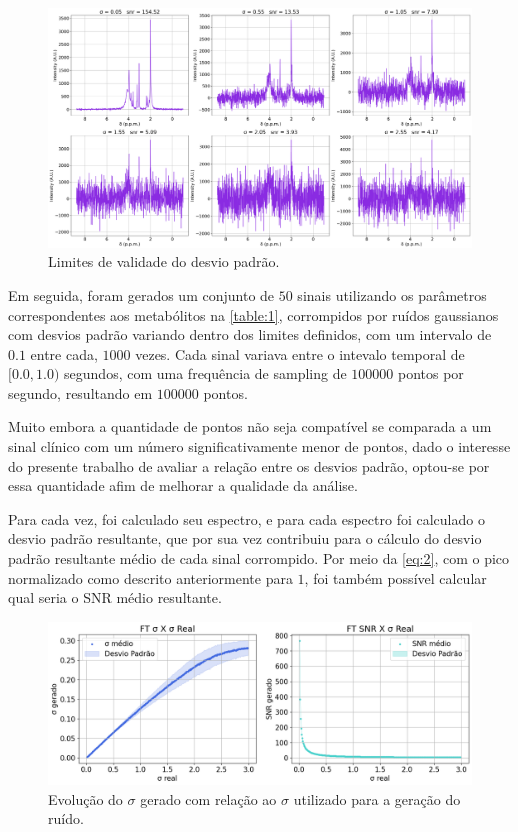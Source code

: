\documentclass[12pt]{article}
\begin{document}
\begin{figure}[H]
    \includegraphics[scale=0.22]{snr_limits.png}
    \centering
    \caption{Limites de validade do desvio padrão.}
    \label{fig:9}
\end{figure}

Em seguida, foram gerados um conjunto de $50$ sinais utilizando os parâmetros correspondentes aos metabólitos na \autoref{table:1}, corrompidos por ruídos gaussianos com desvios padrão variando dentro dos limites definidos, com um intervalo de $0.1$ entre cada, $1000$ vezes. Cada sinal variava 
entre o intevalo temporal de $[0.0, 1.0)$ segundos, com uma frequência de sampling de $100000$ pontos por segundo, resultando em $100000$ pontos. 

Muito embora a quantidade de pontos não seja compatível se comparada a um sinal clínico com um número significativamente menor de pontos, dado o interesse do presente trabalho de avaliar a relação entre os desvios padrão, optou-se por essa quantidade afim de melhorar a qualidade da análise.

Para cada vez, foi calculado seu espectro, e para cada espectro foi calculado o desvio padrão resultante, que por sua vez contribuiu para o cálculo do desvio padrão 
resultante médio de cada sinal corrompido. Por meio da \autoref{eq:2}, com o pico normalizado como descrito anteriormente para $1$, foi também possível calcular qual seria o SNR médio resultante.

\begin{figure} [H]
    \includegraphics[scale=0.37]{evolucao-sigmas.png}
    \centering
    \caption{Evolução do $\sigma$ gerado com relação ao $\sigma$ utilizado para a geração do ruído.}
    \label{fig:6}
\end{figure}
\end{document}
